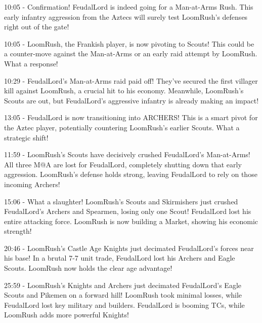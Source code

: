 10:05 - Confirmation! FeudalLord is indeed going for a Man-at-Arms Rush. This early infantry aggression from the Aztecs will surely test LoomRush's defenses right out of the gate! \par \vspace{1em}

10:05 - LoomRush, the Frankish player, is now pivoting to Scouts! This could be a counter-move against the Man-at-Arms or an early raid attempt by LoomRush. What a response! \par \vspace{1em}

10:29 - FeudalLord's Man-at-Arms raid paid off! They've secured the first villager kill against LoomRush, a crucial hit to his economy. Meanwhile, LoomRush's Scouts are out, but FeudalLord's aggressive infantry is already making an impact! \par \vspace{1em}

13:05 - FeudalLord is now transitioning into ARCHERS! This is a smart pivot for the Aztec player, potentially countering LoomRush's earlier Scouts. What a strategic shift! \par \vspace{1em}

11:59 - LoomRush's Scouts have decisively crushed FeudalLord's Man-at-Arms! All three M@A are lost for FeudalLord, completely shutting down that early aggression. LoomRush's defense holds strong, leaving FeudalLord to rely on those incoming Archers! \par \vspace{1em}

15:06 - What a slaughter! LoomRush's Scouts and Skirmishers just crushed FeudalLord's Archers and Spearmen, losing only one Scout! FeudalLord lost his entire attacking force. LoomRush is now building a Market, showing his economic strength! \par \vspace{1em}

20:46 - LoomRush's Castle Age Knights just decimated FeudalLord's forces near his base! In a brutal 7-7 unit trade, FeudalLord lost his Archers and Eagle Scouts. LoomRush now holds the clear age advantage! \par \vspace{1em}

25:59 - LoomRush’s Knights and Archers just decimated FeudalLord’s Eagle Scouts and Pikemen on a forward hill! LoomRush took minimal losses, while FeudalLord lost key military and builders. FeudalLord is booming TCs, while LoomRush adds more powerful Knights! \par \vspace{1em}

